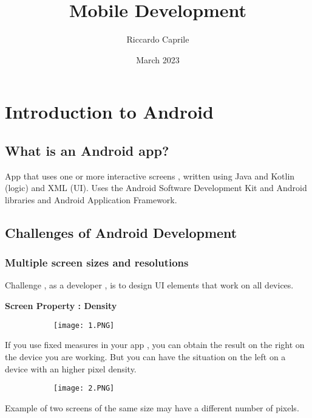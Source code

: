 \documentclass{article}
\title{Mobile Development}
\author{Riccardo Caprile}
\date{March 2023}
\begin{document}
\maketitle

\section{Introduction to Android}

\subsection{What is an Android app?}

App that uses one or more interactive screens , written using Java and Kotlin (logic) and XML (UI). Uses the Android Software Development Kit and Android libraries and Android Application Framework.

\subsection{Challenges of Android Development}

\subsubsection{Multiple screen sizes and resolutions}

Challenge , as a developer , is to design UI elements that work on all devices.

\textbf{Screen Property : Density}

\begin{figure}[ht!]
  \centering
  \begin{subfigure}[b]{0.4\linewidth}
    \texttt{[image: 1.PNG]}
  \end{subfigure}
\end{figure}

If you use fixed measures in your app , you can obtain the result on the right on the device you are working. But you can have the situation on the left on a device with an higher pixel density.

\begin{figure}[ht!]
  \centering
  \begin{subfigure}[b]{0.4\linewidth}
    \texttt{[image: 2.PNG]}
  \end{subfigure}
\end{figure}

Example of two screens of the same size may have a different number of pixels.
\end{document}
